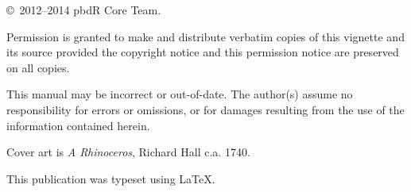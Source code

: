 \null
\vfill
\copyright\ 2012--2014 pbdR Core Team.

Permission is granted to make and distribute verbatim copies of
this vignette and its source provided the copyright notice and
this permission notice are preserved on all copies.

This manual may be incorrect or out-of-date.  The author(s) assume
no responsibility for errors or omissions, or for damages resulting
from the use of the information contained herein.

Cover art is \textit{A Rhinoceros}, Richard Hall c.a. 1740.

This publication was typeset using \LaTeX.

